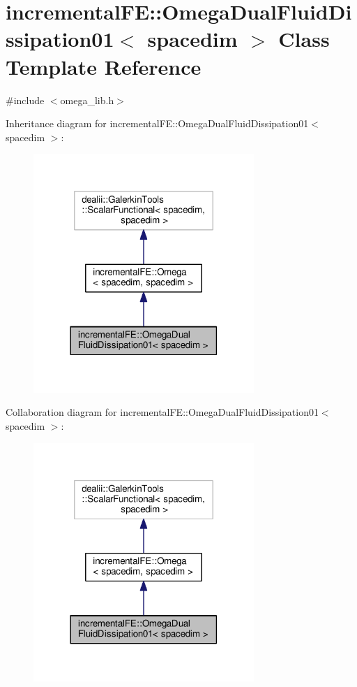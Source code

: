 \hypertarget{classincremental_f_e_1_1_omega_dual_fluid_dissipation01}{}\section{incremental\+FE\+:\+:Omega\+Dual\+Fluid\+Dissipation01$<$ spacedim $>$ Class Template Reference}
\label{classincremental_f_e_1_1_omega_dual_fluid_dissipation01}


{\ttfamily \#include $<$omega\+\_\+lib.\+h$>$}



Inheritance diagram for incremental\+FE\+:\+:Omega\+Dual\+Fluid\+Dissipation01$<$ spacedim $>$\+:\nopagebreak
\begin{figure}[H]
\begin{center}
\leavevmode
\includegraphics[width=237pt]{classincremental_f_e_1_1_omega_dual_fluid_dissipation01__inherit__graph}
\end{center}
\end{figure}


Collaboration diagram for incremental\+FE\+:\+:Omega\+Dual\+Fluid\+Dissipation01$<$ spacedim $>$\+:\nopagebreak
\begin{figure}[H]
\begin{center}
\leavevmode
\includegraphics[width=237pt]{classincremental_f_e_1_1_omega_dual_fluid_dissipation01__coll__graph}
\end{center}
\end{figure}
